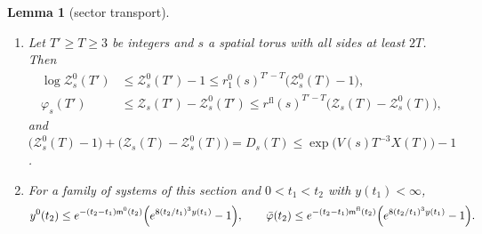 \documentclass[11pt,a4paper]{amsart}
\newtheorem{lemma}[theorem]{Lemma}
\theoremstyle{definition}
\theoremstyle{remark}
\numberwithin{equation}{section}
\newcommand{\TT}{\mathbb{T}}               %
\newcommand{\Zc}{\mathcal{Z}}              %
\newcommand{\Zs}[2]{\Zc_{#1}(#2)}          %
\newcommand{\Dexc}[2]{D_{#1}(#2)}          %
\newcommand{\Vol}[1]{V(#1)}                %
\begin{document}
\begin{lemma}[sector transport]\label{lem:sector-transport}
\begin{enumerate}[label=\textup{(\alph*)},leftmargin=*]
\item Let $T'\ge T\ge3$ be integers and $s$ a spatial torus with all sides at least $2T$. Then
\begin{equation}\label{eq:sector-transport}
\begin{aligned}
\log\Zc^0_s(T')&\le\Zc^0_s(T')-1\le r_1^0(s)^{T'-T}\bigl(\Zc^0_s(T)-1\bigr),\\
\varphi_s(T')&\le\Zs{s}{T'}-\Zc^0_s(T')\le r^{\mathrm{fl}}(s)^{T'-T}\bigl(\Zs{s}{T}-\Zc^0_s(T)\bigr),
\end{aligned}
\end{equation}
and $\bigl(\Zc^0_s(T)-1\bigr)+\bigl(\Zs{s}{T}-\Zc^0_s(T)\bigr)=\Dexc{s}{T}\le\exp\bigl(\Vol{s}T^{-3}X(T)\bigr)-1$.
\item For a family of systems of this section and $0<t_1<t_2$ with $y(t_1)<\infty$,
\[
y^0(t_2)\le e^{-(t_2-t_1)\mathsf m^0(t_2)}\Bigl(e^{8(t_2/t_1)^3y(t_1)}-1\Bigr),\qquad \bar\varphi(t_2)\le e^{-(t_2-t_1)\mathsf m^{\mathrm{fl}}(t_2)}\Bigl(e^{8(t_2/t_1)^3y(t_1)}-1\Bigr).
\]
\end{enumerate}
\end{lemma}
\end{document}
